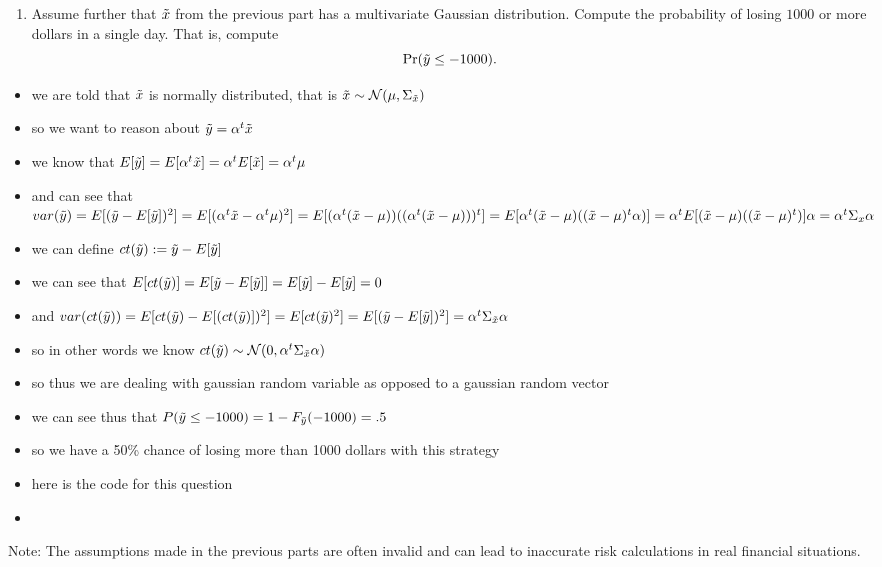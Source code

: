 \documentclass[12pt,twoside]{article}
\begin{document}
\begin{enumerate}
\begin{enumerate}
\begin{itemize}
  \end{itemize}
  \item Assume further that $\tilde{  x }$ from the previous part has a
    multivariate Gaussian distribution.  Compute the probability
    of losing $1000$ or more dollars in a single day.  That is,
    compute
    $$\Pr(\tilde{  y } \leq -1000).$$
  \end{enumerate}
\begin{itemize}
 \color{blue}
  \item we are told that $\Tilde{x}$ is normally distributed, that is $\Tilde{x}\sim \mathcal{N}(\mu, \Sigma_{\Tilde{x}})$ 
  \item so we want to reason about $\Tilde{y}=\alpha^{t}\Tilde{x}$
  \item we know that $E[\tilde{y}]=E[\alpha^{t}\Tilde{x}]=\alpha^{t} E[\Tilde{x}]=\alpha^{t} \mu$
  \item and can see that $var(\Tilde{y})=E[(\Tilde{y}-E[\Tilde{y}])^2]=E[(\alpha^{t} \Tilde{x}-\alpha^{t}\mu)^2]=E[(\alpha^{t}( \Tilde{x}-\mu))((\alpha^{t}( \Tilde{x}-\mu)))^t]=E[\alpha^{t}(\Tilde{x}-\mu)((\Tilde{x}-\mu)^{t}\alpha)]=\alpha^{t}E[(\Tilde{x}-\mu)((\Tilde{x}-\mu)^{t})]\alpha=\alpha^{t}\Sigma_{x}\alpha$
 
  \item we can define $ct(\Tilde{y}):=\Tilde{y}-E[\tilde{y}]$
  \item we can see that $E[ct(\Tilde{y})]=E[\Tilde{y}-E[\Tilde{y}]]=E[\Tilde{y}]-E[\Tilde{y}]=0$
  \item and $var(ct(\Tilde{y}))=E[ct(\Tilde{y})-E[(ct(\Tilde{y})])^2]=E[ct(\Tilde{y})^2]=E[(\Tilde{y}-E[\Tilde{y}])^2]=\alpha^{t}\Sigma_{\Tilde{x}}\alpha$
  \item so in other words we know $ct(\Tilde{y})\sim\mathcal{N}(0,\alpha^{t}\Sigma_{\Tilde{x}}\alpha)$
  \item so thus we are dealing with gaussian random variable as opposed to a gaussian random vector
  \item we can see thus that $P(\Tilde{y}\leq -1000)=1-F_{\Tilde{y}}(-1000)=.5$
  \item so we have a 50\%  chance of losing more than 1000 dollars with this strategy 
  \item here is the code for this question 
  \item \inputminted[firstline=223, lastline=227, breaklines=True]{python}{hw8.py}
\end{itemize}


  Note: The assumptions made in the previous parts are often
  invalid and can lead to inaccurate risk calculations in real
  financial situations. 

\end{enumerate}
\end{document}
